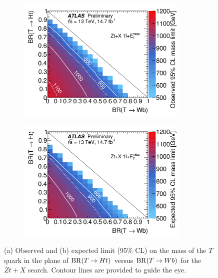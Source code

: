 \begin{figure}[h!]
\begin{subfigure}{0.5\textwidth}
  \centering
  \includegraphics[width=0.9\textwidth]{figures/VLQ/Ztb.png}
  \caption{}
  \label{}
\end{subfigure}
\begin{subfigure}{0.5\textwidth}
  \centering
  \includegraphics[width=0.9\textwidth]{figures/VLQ/Zta.png}
  \caption{}
  \label{}
\end{subfigure}
\captionsetup{width=0.85\textwidth} \caption{\small (a) Observed and (b) expected limit (95\% CL) on the mass of the $T$ quark in the plane 
of ${\rm BR}(T \to Ht)$ versus ${\rm BR}(T \to Wb)$ for the $Zt+X$ search. 
Contour lines are provided to guide the eye.}
\label{sec:vlq:fig:Zt}
\end{figure}


